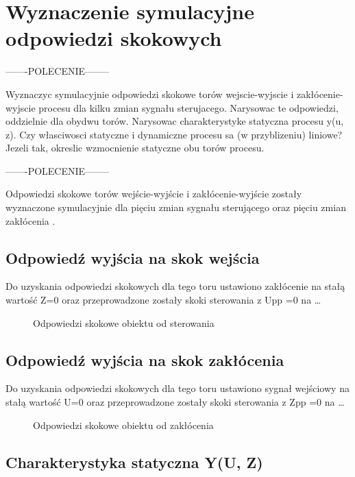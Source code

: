 \section{Wyznaczenie symulacyjne odpowiedzi skokowych}
\label{projekt:zad2}

-------POLECENIE--------

Wyznaczyc symulacyjnie odpowiedzi skokowe torów wejscie-wyjscie i zakłócenie-wyjscie
procesu dla kilku zmian sygnału sterujacego. Narysowac te odpowiedzi, oddzielnie dla
obydwu torów. Narysowac charakterystyke statyczna procesu y(u, z). Czy własciwosci
statyczne i dynamiczne procesu sa (w przyblizeniu) liniowe? Jezeli tak, okreslic
wzmocnienie statyczne obu torów procesu.

-------POLECENIE--------


Odpowiedzi skokowe torów wejście-wyjście i zakłócenie-wyjście zostały wyznaczone
symulacyjnie dla pięciu zmian sygnału sterującego oraz pięciu zmian zakłócenia .

\subsection{Odpowiedź wyjścia na skok wejścia}
\label{projekt:zad2:StepYU}

Do uzyskania odpowiedzi skokowych dla tego toru ustawiono zakłócenie na stałą
wartość Z=0 oraz przeprowadzone zostały skoki sterowania z Upp =0 na …

\begin{figure}[H] 
    \centering
    
    \caption{Odpowiedzi skokowe obiektu od sterowania}
    \label{projekt:zad2:StepYU:figure}
\end{figure}

\subsection{Odpowiedź wyjścia na skok zakłócenia}
\label{projekt:zad2:StepYZ}

Do uzyskania odpowiedzi skokowych dla tego toru ustawiono sygnał wejściowy na stałą
wartość U=0 oraz przeprowadzone zostały skoki sterowania z Zpp =0 na …

\begin{figure}[H] 
    \centering
    
    \caption{Odpowiedzi skokowe obiektu od zakłócenia}
    \label{projekt:zad2:StepYZ:figure}
\end{figure}

\subsection{Charakterystyka statyczna Y(U, Z)}
\label{projekt:zad2:charStat}

